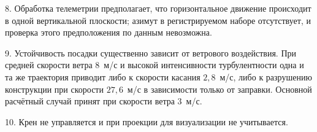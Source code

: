 \documentclass[11pt,a4paper]{article}
\begin{document}
8. Обработка телеметрии предполагает, что горизонтальное движение происходит в
одной вертикальной плоскости; азимут в регистрируемом наборе отсутствует, и
проверка этого предположения по данным невозможна.

9. Устойчивость посадки существенно зависит от ветрового воздействия. При средней
скорости ветра 8~м/с и высокой интенсивности турбулентности одна и та же
траектория приводит либо к скорости касания $2{,}8$~м/с, либо к разрушению
конструкции при скорости $27{,}6$~м/с в зависимости только от заправки. Основной
расчётный случай принят при скорости ветра 3~м/с.

10. Крен не управляется и при проекции для визуализации не учитывается.
\end{document}
